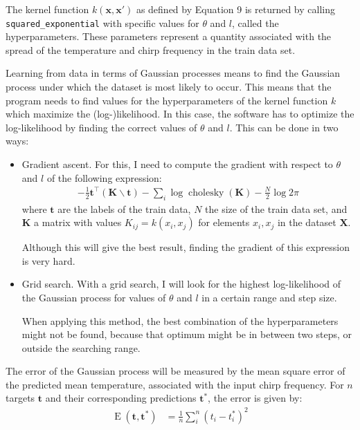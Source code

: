 \documentclass[a4paper,11pt]{article}
\DeclareMathOperator*{\chol}{cholesky}
\DeclareMathOperator*{\err}{E}
\newcommand{\V}[1]{\ensuremath{\boldsymbol{#1}}}
\begin{document}
The kernel function $k(\V{x}, \V{x}')$ as defined by Equation 9 is returned by calling \texttt{squared\_exponential} with specific values for $\theta$ and $l$, called the hyperparameters.  These parameters represent a quantity associated with the spread of the temperature and chirp frequency in the train data set.

Learning from data in terms of Gaussian processes means to find the Gaussian process under which the dataset is most likely to occur.  This means that the program needs to find values for the hyperparameters of the kernel function $k$ which maximize the (log-)likelihood.  In this case, the software has to optimize the log-likelihood by finding the correct values of $\theta$ and $l$.  This can be done in two ways:
\begin{itemize}
\item Gradient ascent.  For this, I need to compute the gradient with respect to $\theta$ and $l$ of the following expression:
\begin{align*}
- \frac{1}{2}\V{t}^\top (\V{K} \backslash \V{t}) - \sum_i \log \chol(\V{K}) - \frac{N}{2} \log 2\pi
\end{align*}
where $\V{t}$ are the labels of the train data, $N$ the size of the train data set, and $\V{K}$ a matrix with values $K_{ij} = k(x_i, x_j)$ for elements $x_i, x_j$ in the dataset $\V{X}$.

Although this will give the best result, finding the gradient of this expression is very hard.

\item Grid search.  With a grid search, I will look for the highest log-likelihood of the Gaussian process for values of $\theta$ and $l$ in a certain range and step size.

When applying this method, the best combination of the hyperparameters might not be found, because that optimum might be in between two steps, or outside the searching range.
\end{itemize}

The error of the Gaussian process will be measured by the mean square error of the predicted mean temperature, associated with the input chirp frequency.  For $n$ targets $\V{t}$ and their corresponding predictions $\V{t}^\ast$, the error is given by:
\begin{align*}
\err(\V{t}, \V{t}^\ast)
  &= \frac{1}{n} \sum_i^n \left(t_i - t^\ast_i\right)^2
\end{align*}
\end{document}
